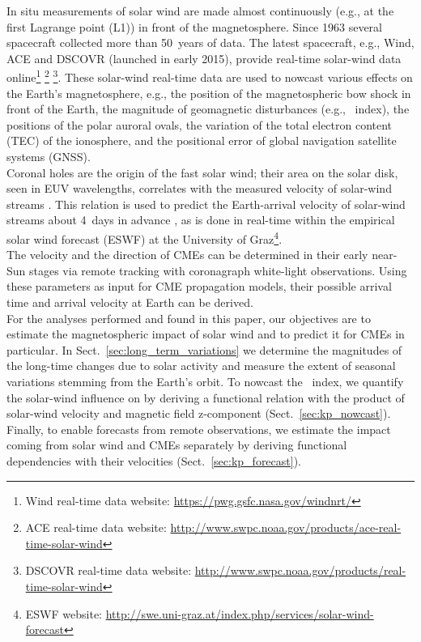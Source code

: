 In situ measurements of solar wind are made almost continuously (e.g., at the first Lagrange point (L1)) in front of the magnetosphere. Since 1963 several spacecraft collected more than 50~years of data. The latest spacecraft, e.g., Wind, ACE and DSCOVR (launched in early 2015), provide real-time solar-wind data online\footnote{Wind real-time data website: \url{https://pwg.gsfc.nasa.gov/windnrt/}} \footnote{ACE real-time data website: \url{http://www.swpc.noaa.gov/products/ace-real-time-solar-wind}} \footnote{DSCOVR real-time data website: \url{http://www.swpc.noaa.gov/products/real-time-solar-wind}}.
These solar-wind real-time data are used to nowcast various effects on the Earth's magnetosphere, e.g., the position of the magnetospheric bow shock in front of the Earth, the magnitude of geomagnetic disturbances (e.g., \Kp~index), the positions of the polar auroral ovals, the variation of the total electron content (TEC) of the ionosphere, and the positional error of global navigation satellite systems (GNSS).\\



Coronal holes are the origin of the fast solar wind; their area on the solar disk, seen in EUV wavelengths, correlates with the measured velocity of solar-wind streams \citep{Vrsnak2007}. This relation is used to predict the Earth-arrival velocity of solar-wind streams about 4~days in advance \citep{Rotter2012}, as is done in real-time within the empirical solar wind forecast (ESWF) at the University of Graz\footnote{ESWF website: \url{http://swe.uni-graz.at/index.php/services/solar-wind-forecast}}.\\

The velocity and the direction of CMEs can be determined in their early near-Sun stages via remote tracking with coronagraph white-light observations. Using these parameters as input for CME propagation models, their possible arrival time and arrival velocity at Earth can be derived.\\



For the analyses performed and found in this paper, our objectives are to estimate the magnetospheric impact of solar wind and to predict it for CMEs in particular. In Sect.~\ref{sec:long_term_variations} we determine the magnitudes of the long-time \Kp{} changes due to solar activity and measure the extent of seasonal variations stemming from the Earth's orbit. To nowcast the \Kp{}~index, we quantify the solar-wind influence on \Kp{} by deriving a functional relation with the product of solar-wind velocity and magnetic field z-component (Sect.~\ref{sec:kp_nowcast}). Finally, to enable \Kp{} forecasts from remote observations, we estimate the \Kp{} impact coming from solar wind and CMEs separately by deriving functional dependencies with their velocities (Sect.~\ref{sec:kp_forecast}).


